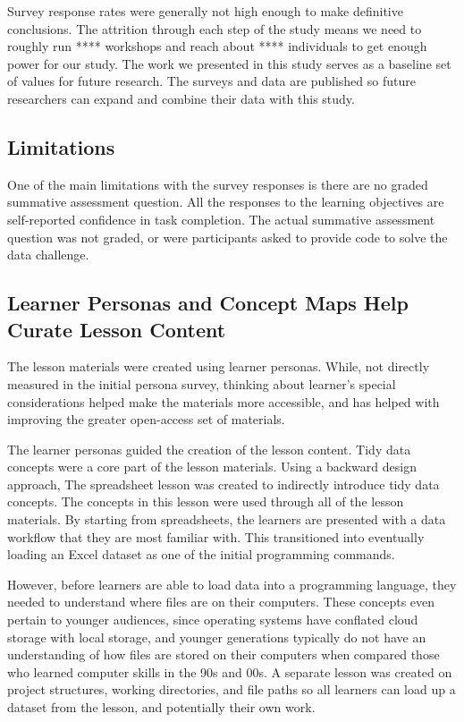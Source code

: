 \documentclass[030-workshop.tex]{subfiles}
\begin{document}
    Survey response rates were generally not high enough to make definitive conclusions.
    The attrition through each step of the study means we need to roughly run ****
    workshops and reach about **** individuals to get enough power for our study.
    The work we presented in this study serves as a baseline set of values for future research.
    The surveys and data are published so future researchers can expand and combine their
    data with this study.

    \subsection{Limitations}

        One of the main limitations with the survey responses is there
        are no graded summative assessment question.
        All the responses to the learning objectives are self-reported confidence in task completion.
        The actual summative assessment question was not graded,
        or were participants asked to provide code to solve the data challenge.

    \subsection{Learner Personas and Concept Maps Help Curate Lesson Content}

        The lesson materials were created using learner personas.
        While, not directly measured in the initial persona survey,
        thinking about learner's special considerations helped make the materials
        more accessible,
        and has helped with improving the greater open-access set of materials.

        The learner personas guided the creation of the lesson content.
        Tidy data concepts were a core part of the lesson materials.
        Using a backward design approach,
        The spreadsheet lesson was created to indirectly introduce tidy data concepts.
        The concepts in this lesson were used through all of the lesson materials.
        By starting from spreadsheets,
        the learners are presented with a data workflow that they are most familiar with.
        This transitioned into eventually loading an Excel dataset as one of the initial programming commands.

        However, before learners are able to load data into a programming language,
        they needed to understand where files are on their computers.
        These concepts even pertain to younger audiences,
        since operating systems have conflated cloud storage with local storage,
        and younger generations typically do not have an understanding of how files are stored on their computers
        when compared those who learned computer skills in the 90s and 00s. %
        A separate lesson was created on project structures, working directories, and file paths
        so all learners can load up a dataset from the lesson, and potentially their own work.
\end{document}
